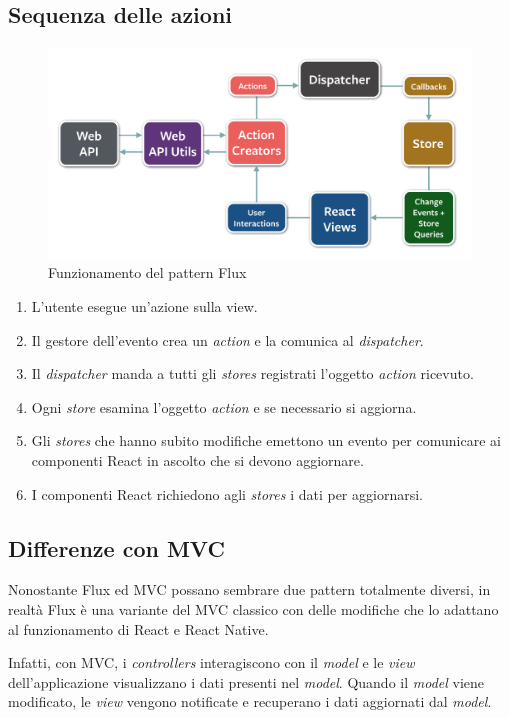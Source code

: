\subsection{Sequenza delle azioni}

\begin{figure}[htp]
\centering
\includegraphics[width=\textwidth*3/4]{../immagini/flux-diagram}
\caption{Funzionamento del pattern Flux}  
\end{figure}
\FloatBarrier

\begin{enumerate}
\item L'utente esegue un'azione sulla view.
\item Il gestore dell'evento crea un \textit{action} e la comunica al \textit{dispatcher}.
\item Il \textit{dispatcher} manda a tutti gli \textit{stores} registrati l'oggetto \textit{action} ricevuto.
\item Ogni \textit{store} esamina l'oggetto  \textit{action} e se necessario si aggiorna. 
\item Gli \textit{stores} che hanno subito modifiche emettono un evento per comunicare ai componenti React in ascolto che si devono aggiornare.
\item I componenti React richiedono agli \textit{stores} i dati per aggiornarsi.
\end{enumerate}

\subsection{Differenze con MVC}

Nonostante Flux ed MVC possano sembrare due pattern totalmente diversi, in realtà Flux è una variante del MVC classico con delle modifiche che lo adattano al funzionamento di React e React Native.

Infatti, con MVC, i \textit{controllers} interagiscono con il \textit{model} e le \textit{view} dell'applicazione visualizzano i dati presenti nel \textit{model}.
Quando il \textit{model} viene modificato, le \textit{view} vengono notificate e recuperano i dati aggiornati dal \textit{model}.

